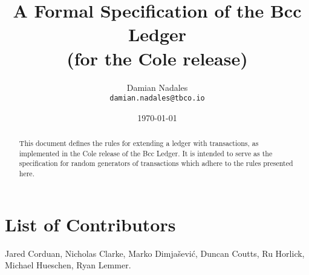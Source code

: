 
\title{
  A Formal Specification of the Bcc Ledger\\
  \small{(for the Cole release)}
}

\author{Damian Nadales \\
  {\small \texttt{damian.nadales@tbco.io}}\\
}

\date{\today}

\maketitle

\begin{abstract}
  This document defines the rules for extending a ledger with transactions, as
  implemented in the Cole release of the Bcc Ledger. It is intended to
  serve as the specification for random generators of transactions which adhere
  to the rules presented here.
\end{abstract}

\section*{List of Contributors}
\label{acknowledgements}

Jared Corduan, Nicholas Clarke, Marko Dimjašević, Duncan Coutts, Ru Horlick,
Michael Hueschen, Ryan Lemmer.
